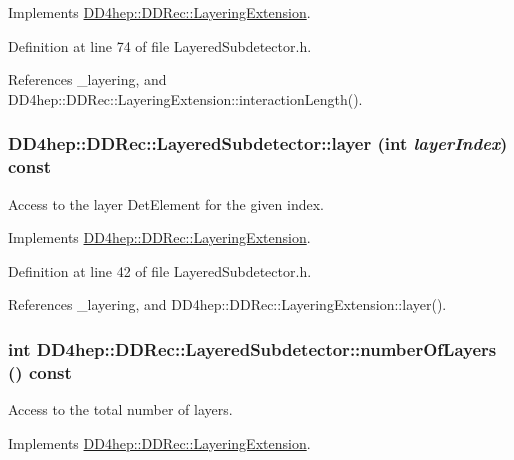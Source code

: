 Implements \hyperlink{class_d_d4hep_1_1_d_d_rec_1_1_layering_extension_aa7959c9c384c0f5ffcd066c5dc01514f}{DD4hep::DDRec::LayeringExtension}.

Definition at line 74 of file LayeredSubdetector.h.

References \_\-layering, and DD4hep::DDRec::LayeringExtension::interactionLength().\hypertarget{class_d_d4hep_1_1_d_d_rec_1_1_layered_subdetector_a3a6258cde1c1acad749e688e9e113bcb}{
\subsubsection[{layer}]{ DD4hep::DDRec::LayeredSubdetector::layer (int {\em layerIndex}) const}}
\label{class_d_d4hep_1_1_d_d_rec_1_1_layered_subdetector_a3a6258cde1c1acad749e688e9e113bcb}


Access to the layer DetElement for the given index. 

Implements \hyperlink{class_d_d4hep_1_1_d_d_rec_1_1_layering_extension_a080be80c3277feaa59828b829d29c747}{DD4hep::DDRec::LayeringExtension}.

Definition at line 42 of file LayeredSubdetector.h.

References \_\-layering, and DD4hep::DDRec::LayeringExtension::layer().\hypertarget{class_d_d4hep_1_1_d_d_rec_1_1_layered_subdetector_adef08a11c41ecdb0595fbe4bd1bd0851}{
\subsubsection[{numberOfLayers}]{\setlength{\rightskip}{0pt plus 5cm}int DD4hep::DDRec::LayeredSubdetector::numberOfLayers () const}}
\label{class_d_d4hep_1_1_d_d_rec_1_1_layered_subdetector_adef08a11c41ecdb0595fbe4bd1bd0851}


Access to the total number of layers. 

Implements \hyperlink{class_d_d4hep_1_1_d_d_rec_1_1_layering_extension_a2a0ee0e2bdb875de6573591e2648e446}{DD4hep::DDRec::LayeringExtension}.

